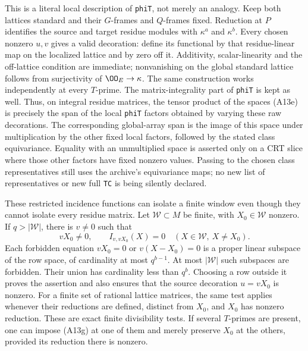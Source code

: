 This is a literal local description of \texttt{phiT}, not
merely an analogy.  Keep both lattices standard and their
$G$-frames and $Q$-frames fixed.  Reduction at $P$ identifies
the source and target residue modules with $\kappa^a$ and
$\kappa^b$.  Every chosen nonzero $u,v$ gives a valid
decoration: define its functional by that residue-linear
map on the localized lattice and by zero off it.  Additivity,
scalar-linearity and the off-lattice condition are immediate;
nonvanishing on the global standard lattice follows from
surjectivity of $\OO_E\to\kappa$.  The same construction
works independently at every $T$-prime.  The matrix-integrality
part of \texttt{phiT} is kept as well.  Thus, on integral
residue matrices, the tensor product of the spaces (A13e)
is precisely the span of the local \texttt{phiT} factors
obtained by varying these raw decorations.  The corresponding
global-array span is the image of this space under multiplication
by the other fixed local factors, followed by the stated class
equivariance.  Equality with an unmultiplied space is asserted
only on a CRT slice where those other factors have fixed nonzero
values.
Passing to the chosen class representatives still uses the
archive's equivariance maps; no new list of representatives
or new full \texttt{TC} is being silently declared.

These restricted incidence functions can isolate a finite
window even though they cannot isolate every residue matrix.
Let $\mathcal W\subset M$ be finite, with $X_0\in\mathcal W$
nonzero.  If $q>|\mathcal W|$, there is $v\ne0$ such that
\[
 vX_0\ne0,\qquad
 I_{v,vX_0}(X)=0\quad(X\in\mathcal W,\ X\ne X_0).
 \tag{A13g}
\]
Each forbidden equation $vX_0=0$ or $v(X-X_0)=0$
is a proper linear subspace of the row space, of cardinality
at most $q^{b-1}$.  At most $|\mathcal W|$ such subspaces
are forbidden.  Their union has cardinality less than $q^b$.
Choosing a row outside it proves the assertion and also
ensures that the source decoration $u=vX_0$ is nonzero.
For a finite set of rational lattice matrices, the same test
applies whenever their reductions are defined, distinct from
$X_0$, and $X_0$ has nonzero reduction.  These are exact
finite divisibility tests.  If several $T$-primes are present,
one can impose (A13g) at one of them and merely preserve
$X_0$ at the others, provided its reduction there is nonzero.

